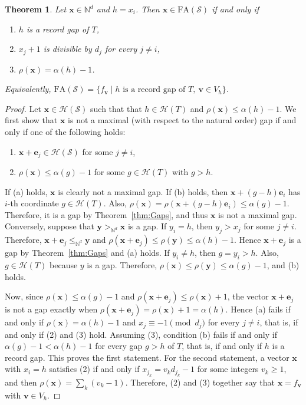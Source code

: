 \documentclass[12pt]{amsart}
\theoremstyle{plain}
\theoremstyle{theorem}
\newtheorem{theorem}[definition]{Theorem}
\theoremstyle{remark}
\begin{document}
\begin{theorem}\label{thm:FA}
Let $\mathbf{x}\in\mathbb{N}^d$ and $h=x_i$. Then $\mathbf{x}\in\mathrm{FA}(\mathcal{S})$ if and only if
\begin{enumerate}
\item $h$ is a record gap of $T$,
\item $x_j+1$ is divisible by $d_j$ for every $j\neq i$, 
\item $\rho(\mathbf{x})=\alpha(h)-1$.
\end{enumerate}
Equivalently, $\mathrm{FA}(\mathcal{S})=\{f_{\mathbf{v}}\mid h\text{ is a record gap of }T,\ \mathbf{v} \in V_h\}$.
\end{theorem}
\begin{proof}
Let $\mathbf{x}\in \mathcal{H}(\mathcal{S})$ such that that $h\in \mathcal{H}(T)$ and $\rho(\mathbf{x})\leq \alpha(h)-1$. We first show that $\mathbf{x}$ is not a maximal (with respect to the natural order) gap if and only if one of the following holds:
\begin{enumerate}\renewcommand{\theenumi}{\alph{enumi}}
\item $\mathbf{x}+\mathbf{e}_j\in \mathcal{H}(\mathcal{S})$ for some $j\neq i$,
\item $\rho(\mathbf{x})\leq \alpha(g)-1$ for some $g\in \mathcal{H}(T)$ with $g>h$.
\end{enumerate}
If (a) holds, $\mathbf{x}$ is clearly not a maximal gap. If (b) holds, then $\mathbf{x}+(g-h)\mathbf{e}_i$ has $i$-th coordinate $g\in \mathcal{H}(T)$. Also, $\rho(\mathbf{x}) = \rho(\mathbf{x}+(g-h)\mathbf{e}_i) \leq \alpha(g)-1$. Therefore, it is a gap by Theorem~\ref{thm:Gaps}, and thus $\mathbf{x}$ is not a maximal gap. Conversely, suppose that $\mathbf{y}>_{\mathbb{N}^d} \mathbf{x}$ is a gap. If $y_i=h$, then $y_j>x_j$ for some $j\neq i$. Therefore, $\mathbf{x}+\mathbf{e}_j\leq_{\mathbb{N}^d} \mathbf{y}$ and $\rho(\mathbf{x}+\mathbf{e}_j) \leq \rho(\mathbf{y}) \leq \alpha(h)-1$. Hence $\mathbf{x}+\mathbf{e}_j$ is a gap by Theorem~\ref{thm:Gaps} and (a) holds. If $y_i\neq h$, then $g=y_i>h$. Also, $g\in \mathcal{H}(T)$ because $y$ is a gap. Therefore, $\rho(\mathbf{x})\leq \rho(\mathbf{y})\leq \alpha(g)-1$, and (b) holds.

Now, since $\rho(\mathbf{x})\leq \alpha(g)-1$ and $\rho(\mathbf{x}+\mathbf{e}_j) \leq \rho(\mathbf{x})+1$, the vector $\mathbf{x}+\mathbf{e}_j$ is not a gap exactly when $\rho(\mathbf{x}+\mathbf{e}_j) = \rho(\mathbf{x})+1=\alpha(h)$. 
Hence (a) fails if and only if $\rho(\mathbf{x})=\alpha(h)-1$ and $x_j\equiv-1\pmod{d_j}$ for every $j\neq i$, that is, if and only if (2) and (3) hold. 
Assuming (3), condition (b) fails if and only if $\alpha(g)-1<\alpha(h)-1$ for every gap $g>h$ of $T$, that is, if and only if $h$ is a record gap. This proves the first statement. For the second statement, a vector $\mathbf{x}$ with $x_i=h$ satisfies (2) if and only if $x_{j_k}=v_kd_{j_k}-1$ for some integers $v_k \geq 1$, and then $\rho(\mathbf{x})=\sum_k(v_k-1)$. Therefore, (2) and (3) together say that $\mathbf{x}=f_{\mathbf{v}}$ with $\mathbf{v} \in V_h$.
\end{proof}
\end{document}
